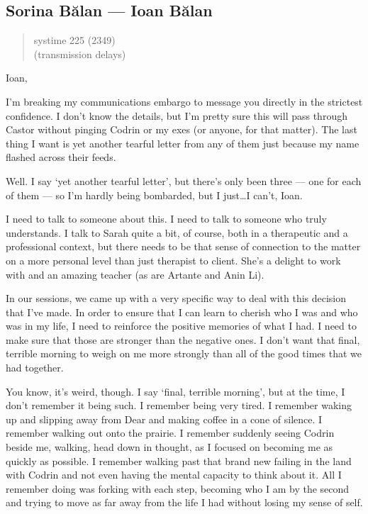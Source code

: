 \hypertarget{sorina-bux103lan-ioan-bux103lan}{%
\subsection{Sorina Bălan — Ioan Bălan}\label{sorina-bux103lan-ioan-bux103lan}}

\begin{quote}
systime 225 (2349)\\
(transmission delays)
\end{quote}

Ioan,

I'm breaking my communications embargo to message you directly in the strictest confidence. I don't know the details, but I'm pretty sure this will pass through Castor without pinging Codrin or my exes (or anyone, for that matter). The last thing I want is yet another tearful letter from any of them just because my name flashed across their feeds.

Well. I say `yet another tearful letter', but there's only been three — one for each of them — so I'm hardly being bombarded, but I just\ldots I can't, Ioan.

I need to talk to someone about this. I need to talk to someone who truly understands. I talk to Sarah quite a bit, of course, both in a therapeutic and a professional context, but there needs to be that sense of connection to the matter on a more personal level than just therapist to client. She's a delight to work with and an amazing teacher (as are Artante and Anin Li).

In our sessions, we came up with a very specific way to deal with this decision that I've made. In order to ensure that I can learn to cherish who I was and who was in my life, I need to reinforce the positive memories of what I had. I need to make sure that those are stronger than the negative ones. I don't want that final, terrible morning to weigh on me more strongly than all of the good times that we had together.

You know, it's weird, though. I say `final, terrible morning', but at the time, I don't remember it being such. I remember being very tired. I remember waking up and slipping away from Dear and making coffee in a cone of silence. I remember walking out onto the prairie. I remember suddenly seeing Codrin beside me, walking, head down in thought, as I focused on becoming me as quickly as possible. I remember walking past that brand new failing in the land with Codrin and not even having the mental capacity to think about it. All I remember doing was forking with each step, becoming who I am by the second and trying to move as far away from the life I had without losing my sense of self.

